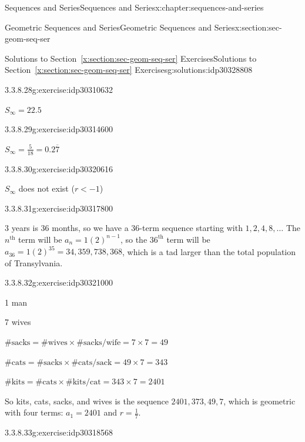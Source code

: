 \documentclass[twoside,10pt,]{book}
\newcommand{\xreffont}{\relax}
\numberwithin{equation}{section}
\newcommand{\nth}{{n^{\text{th}}}}
\newcommand{\upth}[1]{{#1^{\text{th}}}}
\newcommand{\infinity}{{\infty}}
\newcommand{\lt}{<}
\begin{document}
\begin{chapterptx}{Sequences and Series}{}{Sequences and Series}{}{}{x:chapter:sequences-and-series}
\begin{sectionptx}{Geometric Sequences and Series}{}{Geometric Sequences and Series}{}{}{x:section:sec-geom-seq-ser}
\begin{solutions-subsection}{Solutions to Section~{\xreffont\ref*{x:section:sec-geom-seq-ser}} Exercises}{}{Solutions to Section~{\xreffont\ref*{x:section:sec-geom-seq-ser}} Exercises}{}{}{g:solutions:idp30328808}
\begin{exercisegroup}
\begin{divisionsolutioneg}{3.3.8.28}{}{g:exercise:idp30310632}%
\par\smallskip%
\noindent\hypertarget{g:solution:idp30314088-main}{}\(S_\infinity  = 22.5\)\end{divisionsolutioneg}%
\begin{divisionsolutioneg}{3.3.8.29}{}{g:exercise:idp30314600}%
\par\smallskip%
\noindent\hypertarget{g:solution:idp30316520-main}{}\(S_\infinity = \frac{5}{{18}} = 0.2\overline 7\)\end{divisionsolutioneg}%
\begin{divisionsolutioneg}{3.3.8.30}{}{g:exercise:idp30320616}%
\par\smallskip%
\noindent\hypertarget{g:solution:idp30319976-main}{}\(S_\infinity\) does not exist (\(r \lt -1\))\end{divisionsolutioneg}%
\end{exercisegroup}
\par\medskip\noindent
\begin{divisionsolution}{3.3.8.31}{}{g:exercise:idp30317800}%
\par\smallskip%
\noindent\hypertarget{g:solution:idp30320872-main}{}3 years is 36 months, so we have a 36-term sequence starting with \(1, 2, 4, 8, \ldots\)  The \(\nth{}\) term will be \({a_n} = 1{\left( 2 \right)^{n - 1}}\), so the \(\upth{36}\) term will be \({a_{36}} = 1{\left( 2 \right)^{35}} = 34,359,738,368\), which is a tad larger than the total population of Transylvania.\end{divisionsolution}%
\begin{divisionsolution}{3.3.8.32}{}{g:exercise:idp30321000}%
\par\smallskip%
\noindent\hypertarget{g:solution:idp30320744-main}{}1 man%
\par
7 wives%
\par
\(\# \text{sacks} = \#\text{wives} \times \# \text{sacks/wife} = 7 \times 7 = 49\)%
\par
\(\# \text{cats} = \#\text{sacks} \times \# \text{cats/sack} = 49 \times 7 = 343\)%
\par
\(\# \text{kits} = \#\text{cats} \times \# \text{kits/cat} = 343 \times 7 = 2401\)%
\par
So kits, cats, sacks, and wives is the sequence \(2401, 373, 49, 7\), which is geometric with four terms:  \(a_1 = 2401\) and \(r = \frac{1}{7}\).%
\end{divisionsolution}%
\begin{divisionsolution}{3.3.8.33}{}{g:exercise:idp30318568}%

\end{divisionsolution}
\end{solutions-subsection}
\end{sectionptx}
\end{chapterptx}
\end{document}

